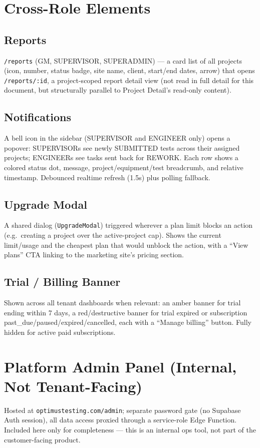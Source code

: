 \documentclass[11pt]{article}
\begin{document}
\section{Cross-Role Elements}

\subsection{Reports}
\texttt{/reports} (GM, SUPERVISOR, SUPERADMIN) --- a card list of all projects (icon, number,
status badge, site name, client, start/end dates, arrow) that opens \texttt{/reports/:id}, a
project-scoped report detail view (not read in full detail for this document, but structurally
parallel to Project Detail's read-only content).

\subsection{Notifications}
A bell icon in the sidebar (SUPERVISOR and ENGINEER only) opens a popover: SUPERVISORs see newly
SUBMITTED tests across their assigned projects; ENGINEERs see tasks sent back for REWORK. Each row
shows a colored status dot, message, project/equipment/test breadcrumb, and relative timestamp.
Debounced realtime refresh (1.5s) plus polling fallback.

\subsection{Upgrade Modal}
\label{sec:upgrade}
A shared dialog (\texttt{UpgradeModal}) triggered wherever a plan limit blocks an action (e.g.\
creating a project over the active-project cap). Shows the current limit/usage and the cheapest
plan that would unblock the action, with a ``View plans'' CTA linking to the marketing site's
pricing section.

\subsection{Trial / Billing Banner}
Shown across all tenant dashboards when relevant: an amber banner for trial ending within 7 days,
a red/destructive banner for trial expired or subscription past\_due/paused/expired/cancelled, each
with a ``Manage billing'' button. Fully hidden for active paid subscriptions.

\section{Platform Admin Panel (Internal, Not Tenant-Facing)}
Hosted at \texttt{optimustesting.com/admin}; separate password gate (no Supabase Auth session), all
data access proxied through a service-role Edge Function. Included here only for completeness ---
this is an internal ops tool, not part of the customer-facing product.
\end{document}
